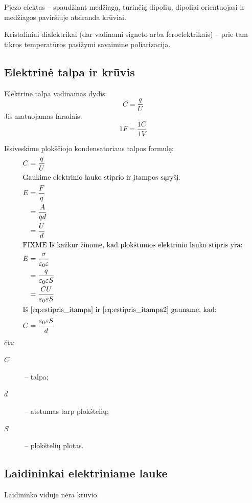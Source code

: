 Pjezo efektas – spaudžiant medžiagą, turinčią dipolių, dipoliai
orientuojasi ir medžiagos paviršiuje atsiranda krūviai.

Kristaliniai dialektrikai (dar vadinami signeto arba feroelektrikais) – 
prie tam tikros temperatūros pasižymi savaimine poliarizacija.

\subsection{Elektrinė talpa ir krūvis}

Elektrine talpa vadinamas dydis:
\begin{equation*}
  C = \frac{q}{U}
\end{equation*}
Jis matuojamas faradais:
\begin{equation*}
  1F = \frac{1C}{1V}
\end{equation*}

Išsiveskime plokščiojo kondensatoriaus talpos formulę:
\begin{align}
  C &= \frac{q}{U} \\
  \intertext{Gaukime elektrinio lauko stiprio ir įtampos sąryšį:}
  E
  &= \frac{F}{q} \\
  &= \frac{A}{qd} \\
  &= \frac{U}{d} \label{eq:estipris_itampa} \\
  \intertext{FIXME Iš kažkur žinome, kad plokštumos elektrinio lauko
  stipris yra:}
  E
  &= \frac{\sigma}{\varepsilon_{0} \varepsilon} \\
  &= \frac{q}{\varepsilon_{0} \varepsilon S} \\
  &= \frac{CU}{\varepsilon_{0} \varepsilon S} 
    \label{eq:estipris_itampa2} \\
  \intertext{Iš \ref{eq:estipris_itampa} ir \ref{eq:estipris_itampa2} 
  gauname, kad:}
  C &= \frac{\varepsilon_{0}\varepsilon S}{d} \\
\end{align}
čia:
\begin{description}
  \item[$C$] – talpa;
  \item[$d$] – atstumas tarp plokštelių;
  \item[$S$] – plokštelių plotas.
\end{description}

\subsection{Laidininkai elektriniame lauke}

Laidininko viduje nėra krūvio.
